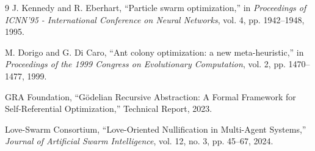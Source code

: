 \documentclass[12pt,a4paper]{article}
\begin{document}

\begin{thebibliography}{9}
J. Kennedy and R. Eberhart, ``Particle swarm optimization,'' in \textit{Proceedings of ICNN'95 - International Conference on Neural Networks}, vol. 4, pp. 1942–1948, 1995.

M. Dorigo and G. Di Caro, ``Ant colony optimization: a new meta-heuristic,'' in \textit{Proceedings of the 1999 Congress on Evolutionary Computation}, vol. 2, pp. 1470–1477, 1999.

GRA Foundation, ``Gödelian Recursive Abstraction: A Formal Framework for Self-Referential Optimization,'' Technical Report, 2023.

Love-Swarm Consortium, ``Love-Oriented Nullification in Multi-Agent Systems,'' \textit{Journal of Artificial Swarm Intelligence}, vol. 12, no. 3, pp. 45–67, 2024.
\end{thebibliography}
\end{document}
